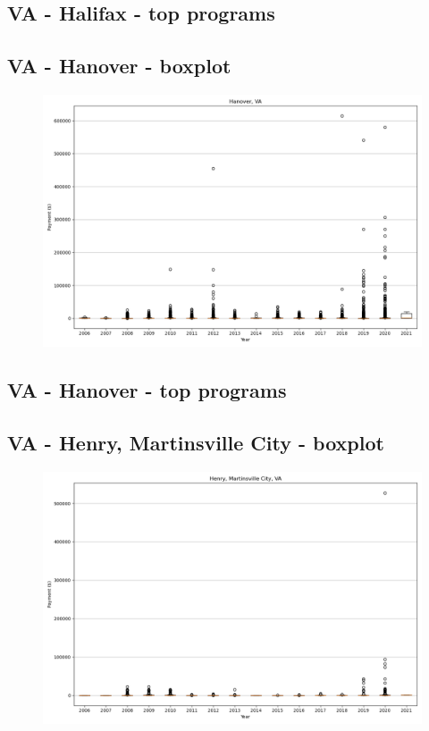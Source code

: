 \subsection*{VA - Halifax - top programs}

\newpage
\subsection*{VA - Hanover - boxplot}
\begin{figure}[h]
\centering
\includegraphics[width=7in]{../output/boxplots/counties/Hanover-VA_boxplot.png}
\end{figure}


\subsection*{VA - Hanover - top programs}

\newpage
\subsection*{VA - Henry, Martinsville City - boxplot}
\begin{figure}[h]
\centering
\includegraphics[width=7in]{../output/boxplots/counties/Henry, Martinsville City-VA_boxplot.png}
\end{figure}



